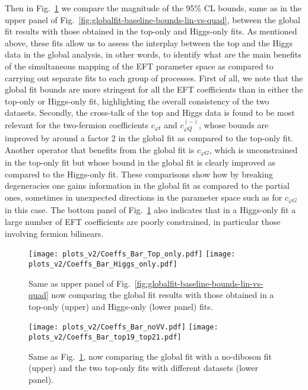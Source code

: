 Then in Fig.~\ref{fig:global_vs_toponly} we compare the magnitude of the 95\% CL bounds,
same as in the upper panel of Fig.~\ref{fig:globalfit-baseline-bounds-lin-vs-quad},
between the global fit results with those obtained in the top-only 
and Higgs-only fits.
%
As mentioned above, these fits
allow us to  assess the interplay
between the top and the Higgs data in the global analysis, in other words,
to identify what are the main benefits of the simultaneous mapping of the EFT parameter space
as compared to carrying out separate fits to each group of processes.
%
First of all, we note that the global fit bounds are more stringent for
all the EFT coefficients than in either the top-only or Higgs-only fit, highlighting the overall
consistency of the two datasets.
%
Secondly, the cross-talk of the top and Higgs data is found to be most
relevant for the two-fermion coefficients $c_{\varphi t}$
and $c_{\varphi Q}^{(-)}$, whose bounds are improved
by around a factor 2 in the global fit as compared to the top-only fit.
%
Another operator that benefits from the global fit is
$c_{\varphi G}$, which is unconstrained in the top-only fit but
whose bound in the global fit is clearly improved as compared to the Higgs-only fit.
%
These comparisons show how by breaking degeneracies one gains information in the global fit as compared to the partial ones, sometimes in unexpected directions in the parameter space such as for $c_{\varphi G}$  in this case.
%
The bottom panel of Fig.~\ref{fig:global_vs_toponly} also indicates that in a Higgs-only fit
a large number of EFT coefficients are poorly constrained, in particular
those involving fermion bilinears.

\begin{figure}[t]
  \begin{center}
    \texttt{[image: plots\_v2/Coeffs\_Bar\_Top\_only.pdf]}
    \texttt{[image: plots\_v2/Coeffs\_Bar\_Higgs\_only.pdf]}
    \caption{\label{fig:global_vs_toponly} \small
      Same as upper panel of Fig.~\ref{fig:globalfit-baseline-bounds-lin-vs-quad}
      now comparing the global fit results with those obtained in a top-only (upper)
    and Higgs-only (lower panel) fits.}
  \end{center}
\end{figure}

\begin{figure}[t]
  \begin{center}
    \texttt{[image: plots\_v2/Coeffs\_Bar\_noVV.pdf]}
   \texttt{[image: plots\_v2/Coeffs\_Bar\_top19\_top21.pdf]}
    \caption{\label{fig:global_vs_top2019} \small
      Same as Fig.~\ref{fig:global_vs_toponly},
      now comparing the global fit with a no-diboson fit (upper)
    and the two top-only fits with different datasets (lower panel).}
  \end{center}
\end{figure}

